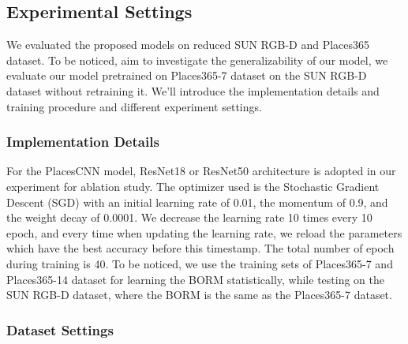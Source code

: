 

\subsection{Experimental Settings}
We evaluated the proposed models on reduced SUN RGB-D and Places365 dataset. To be noticed, aim to investigate the generalizability of our model, we evaluate our model pretrained on Places365-7 dataset on the SUN RGB-D dataset without retraining it. We'll introduce the implementation details and training procedure and different experiment settings.

\subsubsection{Implementation Details}
For the PlacesCNN model, ResNet18 or ResNet50 architecture is adopted in our experiment for ablation study. The optimizer used is the Stochastic Gradient Descent (SGD) with an initial learning rate of 0.01, the momentum of 0.9, and the weight decay of 0.0001. We decrease the learning rate 10 times every 10 epoch, and every time when updating the learning rate, we reload the parameters which have the best accuracy before this timestamp. The total number of epoch during training is 40. To be noticed, we use the training sets of Places365-7 and Places365-14 dataset for learning the BORM statistically, while testing on the SUN RGB-D dataset, where the BORM is the same as the Places365-7 dataset. 


\subsubsection{Dataset Settings}

